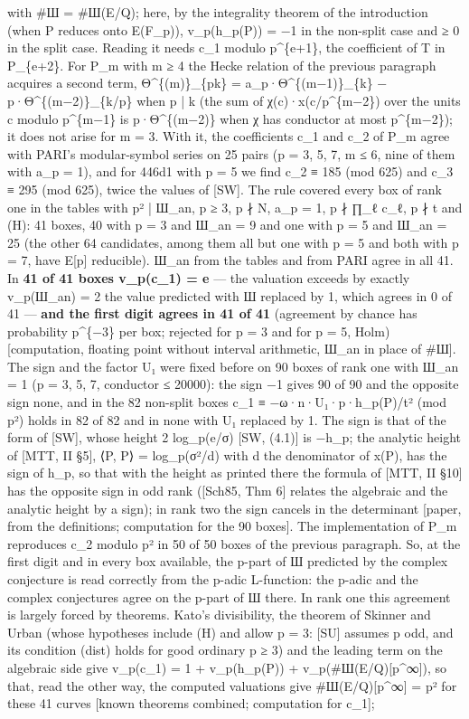 \documentclass[11pt,a4paper]{article}
\theoremstyle{named}
\begin{document}
with \#Ш = \#Ш(E/Q); here, by the integrality theorem of the introduction (when P reduces onto E(F\_p)), v\_p(h\_p(P)) = −1 in the non-split case and ≥ 0 in the split case. Reading it needs c\_1 modulo p\textasciicircum{}\{e+1\}, the coefficient of T in P\_\{e+2\}. For P\_m with m ≥ 4 the Hecke relation of the previous paragraph acquires a second term, Θ\textasciicircum{}\{(m)\}\_\{pk\} = a\_p·Θ\textasciicircum{}\{(m−1)\}\_\{k\} − p·Θ\textasciicircum{}\{(m−2)\}\_\{k/p\} when p | k (the sum of χ(c)·x(c/p\textasciicircum{}\{m−2\}) over the units c modulo p\textasciicircum{}\{m−1\} is p·Θ\textasciicircum{}\{(m−2)\} when χ has conductor at most p\textasciicircum{}\{m−2\}); it does not arise for m = 3. With it, the coefficients c\_1 and c\_2 of P\_m agree with PARI's modular-symbol series on 25 pairs (p = 3, 5, 7, m ≤ 6, nine of them with a\_p = 1), and for 446d1 with p = 5 we find c\_2 ≡ 185 (mod 625) and c\_3 ≡ 295 (mod 625), twice the values of [SW]. The rule covered every box of rank one in the tables with p² | Ш\_an, p ≥ 3, p ∤ N, a\_p = 1, p ∤ ∏\_ℓ c\_ℓ, p ∤ t and (H): 41 boxes, 40 with p = 3 and Ш\_an = 9 and one with p = 5 and Ш\_an = 25 (the other 64 candidates, among them all but one with p = 5 and both with p = 7, have E[p] reducible). Ш\_an from the tables and from PARI agree in all 41. In \textbf{41 of 41 boxes v\_p(c\_1) = e} — the valuation exceeds by exactly v\_p(Ш\_an) = 2 the value predicted with Ш replaced by 1, which agrees in 0 of 41 — \textbf{and the first digit agrees in 41 of 41} (agreement by chance has probability p\textasciicircum{}\{−3\} per box; rejected for p = 3 and for p = 5, Holm) [computation, floating point without interval arithmetic, Ш\_an in place of \#Ш]. The sign and the factor U₁ were fixed before on 90 boxes of rank one with Ш\_an = 1 (p = 3, 5, 7, conductor ≤ 20000): the sign −1 gives 90 of 90 and the opposite sign none, and in the 82 non-split boxes c\_1 ≡ −ω·n·U₁·p·h\_p(P)/t² (mod p²) holds in 82 of 82 and in none with U₁ replaced by 1. The sign is that of the form of [SW], whose height 2 log\_p(e/σ) [SW, (4.1)] is −h\_p; the analytic height of [MTT, II §5], ⟨P, P⟩ = log\_p(σ²/d) with d the denominator of x(P), has the sign of h\_p, so that with the height as printed there the formula of [MTT, II §10] has the opposite sign in odd rank ([Sch85, Thm 6] relates the algebraic and the analytic height by a sign); in rank two the sign cancels in the determinant [paper, from the definitions; computation for the 90 boxes]. The implementation of P\_m reproduces c\_2 modulo p² in 50 of 50 boxes of the previous paragraph. So, at the first digit and in every box available, the p-part of Ш predicted by the complex conjecture is read correctly from the p-adic L-function: the p-adic and the complex conjectures agree on the p-part of Ш there. In rank one this agreement is largely forced by theorems. Kato's divisibility, the theorem of Skinner and Urban (whose hypotheses include (H) and allow p = 3: [SU] assumes p odd, and its condition (dist) holds for good ordinary p ≥ 3) and the leading term on the algebraic side give v\_p(c\_1) = 1 + v\_p(h\_p(P)) + v\_p(\#Ш(E/Q)[p\textasciicircum{}∞]), so that, read the other way, the computed valuations give \#Ш(E/Q)[p\textasciicircum{}∞] = p² for these 41 curves [known theorems combined; computation for c\_1]; 
\end{document}
